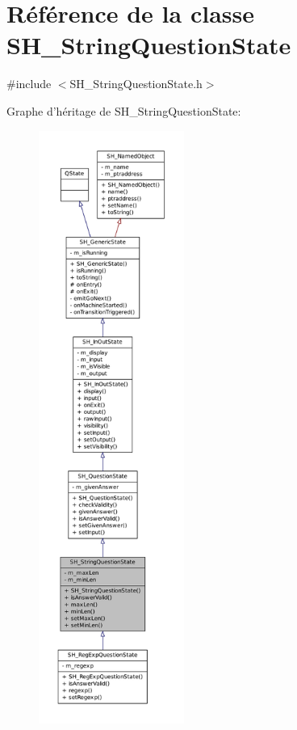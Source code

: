 \hypertarget{classSH__StringQuestionState}{\section{Référence de la classe S\-H\-\_\-\-String\-Question\-State}
\label{classSH__StringQuestionState}
}


{\ttfamily \#include $<$S\-H\-\_\-\-String\-Question\-State.\-h$>$}



Graphe d'héritage de S\-H\-\_\-\-String\-Question\-State\-:
\nopagebreak
\begin{figure}[H]
\begin{center}
\leavevmode
\includegraphics[height=550pt]{classSH__StringQuestionState__inherit__graph}
\end{center}
\end{figure}


